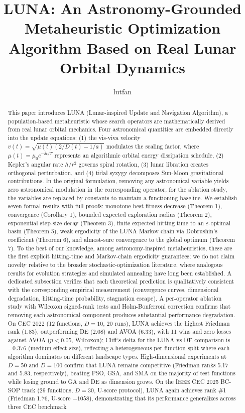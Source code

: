 \documentclass[review]{elsarticle}
\theoremstyle{definition}
\begin{document}
\begin{frontmatter}

\title{LUNA: An Astronomy-Grounded Metaheuristic Optimization Algorithm Based on Real Lunar Orbital Dynamics}

\author{lutfan}
\address{lutfan}

\begin{abstract}
This paper introduces LUNA (Lunar-inspired Update and Navigation Algorithm), a population-based metaheuristic whose search operators are mathematically derived from real lunar orbital mechanics. Four astronomical quantities are embedded directly into the update equations: (1) the vis-viva velocity $v(t) = \sqrt{\mu(t)(2/D(t) - 1/a)}$ modulates the scaling factor, where $\mu(t) = \mu_0 e^{-\delta t/T}$ represents an algorithmic orbital energy dissipation schedule, (2) Kepler's angular rate $h/r^2$ governs spiral rotation, (3) lunar libration creates orthogonal perturbation, and (4) tidal syzygy decomposes Sun-Moon gravitational contributions. In the original formulation, removing any astronomical variable yields zero astronomical modulation in the corresponding operator; for the ablation study, the variables are replaced by constants to maintain a functioning baseline. We establish seven formal results with full proofs: monotone best-fitness decrease (Theorem 1), convergence (Corollary 1), bounded expected exploration radius (Theorem 2), exponential step-size decay (Theorem 3), finite expected hitting time to an $\varepsilon$-optimal basin (Theorem 5), weak ergodicity of the LUNA Markov chain via Dobrushin's coefficient (Theorem 6), and almost-sure convergence to the global optimum (Theorem 7). To the best of our knowledge, among astronomy-inspired metaheuristics, these are the first explicit hitting-time and Markov-chain ergodicity guarantees; we do not claim novelty relative to the broader stochastic-optimization literature, where analogous results for evolution strategies and simulated annealing have long been established. A dedicated subsection verifies that each theoretical prediction is qualitatively consistent with the corresponding empirical measurement (convergence curves, dimensional degradation, hitting-time probability, stagnation escape). A per-operator ablation study with Wilcoxon signed-rank tests and Holm-Bonferroni correction confirms that removing each astronomical component produces substantial performance degradation. On CEC 2022 (12 functions, $D=10$, 20 runs), LUNA achieves the highest Friedman rank (1.83), outperforming DE (2.08) and AVOA (6.33), with 11 wins and zero losses against AVOA ($p < 0.05$, Wilcoxon); Cliff's delta for the LUNA-vs-DE comparison is $-0.376$ (medium effect size), reflecting a heterogeneous per-function split where each algorithm dominates on different landscape types. High-dimensional experiments at $D=50$ and $D=100$ confirm that LUNA remains competitive (Friedman ranks 5.17 and 5.83, respectively), beating PSO, GSA, and SMA on the majority of test functions while losing ground to GA and DE as dimension grows. On the IEEE CEC 2025 BC-SOP track (29 functions, $D=30$, U-score protocol), LUNA again achieves rank \#1 (Friedman 1.76, U-score $-1058$), demonstrating that its performance generalizes across three CEC benchmark 
\end{abstract}
\end{frontmatter}
\end{document}
